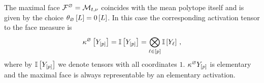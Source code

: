 \begin{example}
    \label{exa:maximalFaceMeasure}
    The maximal face $\mathcal{F}^{\varnothing}=\mathcal{M}_{t,\nu}$ coincides with the mean polytope itself and is given by the choice $\theta_{\varnothing}\left[L\right]=0\left[L\right]$.
    In this case the corresponding activation tensor to the face measure is
    \begin{align*}
        \kappa^{\varnothing}\left[Y_{[p]}\right]
        = \mathbb{I}\left[Y_{[p]}\right]
        = \bigotimes_{\ell\in[p]}\mathbb{I}\left[Y_{\ell}\right] \, ,
    \end{align*}
    where by $\mathbb{I}\left[Y_{[p]}\right]$ we denote tensors with all coordinates $1$.
    $\kappa^{\varnothing}{Y_{[p]}}$ is elementary and the maximal face is always representable by an elementary activation.
\end{example}